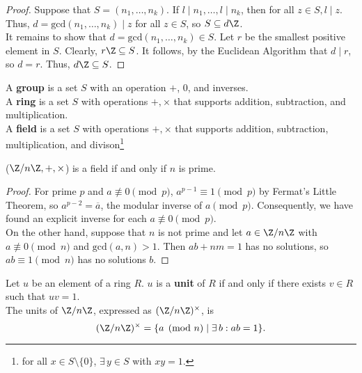 \documentclass[11pt]{article}
\begin{document}
\begin{proof}
Suppose that $S = (n_1, \dots, n_k).$ If $l \mid n_1, \dots, l \mid n_k$, then for all $z \in S, l \mid z$. 
Thus, $d = \mathrm{gcd}(n_1, \dots, n_k) \mid z$ for all $z \in S$, so $S \subseteq d\Z$. \\

It remains to show that $d = \mathrm{gcd}(n_1, \dots, n_k) \in S.$ Let $r$ be the smallest positive element in $S$. Clearly, $r\Z \subseteq S$. 
It follows, by the Euclidean Algorithm that $d \mid r$, so $d = r$. Thus, $d\Z \subseteq S$.
\end{proof}

\begin{definition}
A \textbf{group} is a set $S$ with an operation $+$, $0$, and inverses. \\

A \textbf{ring} is a set $S$ with operations $+, \times$ that supports addition, subtraction, and multiplication. \\

A \textbf{field} is a set $S$ with operations $+, \times$ that supports addition, subtraction, multiplication, and divison\footnote{for all $x \in S \setminus \{0\}$, $\exists \, y \in S$ with $xy = 1$.}
\end{definition}

\begin{theorem}
($\Z / n\Z, +, \times$) is a field if and only if $n$ is prime.
\end{theorem}

\begin{proof}
For prime $p$ and $a \not\equiv 0 \pmod p$, $a^{p-1} \equiv 1 \pmod p$ by Fermat's Little Theorem, so $a^{p-2} = \overline{a}$, the modular inverse of $a \pmod p.$ Consequently, we have
found an explicit inverse for each $a \not\equiv 0 \pmod p$. \\

On the other hand, suppose that $n$ is not prime and let $a \in \Z / n\Z$ with $a \not\equiv 0 \pmod n$ and $\mathrm{gcd}(a, n) > 1$. Then $ab + nm = 1$ has no solutions, so $ab \equiv 1 \pmod n$ has no solutions $b$.  
\end{proof}

\begin{definition}[Units]
Let $u$ be an element of a ring $R$. $u$ is a \textbf{unit} of $R$ if and only if there exists $v \in R$ such that $uv = 1$. \\

The units of $\Z / n\Z$, expressed as $(\Z / n\Z)^{\times}$, is
\[
    (\Z / n\Z)^{\times} = \{ a \pmod{n} \mid \exists \,b : ab = 1 \}.
\]
\end{definition}
\end{document}
